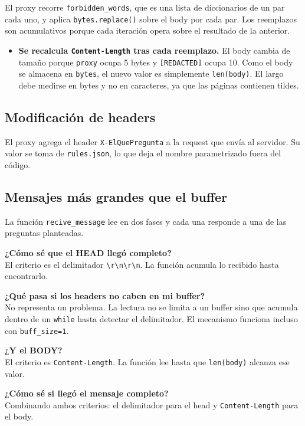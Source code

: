 \documentclass[11pt,a4paper]{article}
\newcommand{\crlf}{\texttt{\textbackslash r\textbackslash n}}
\begin{document}
El proxy recorre \texttt{forbidden\_words}, que es una lista de diccionarios de un par cada uno, y
aplica \texttt{bytes.replace()} sobre el body por cada par. Los reemplazos son acumulativos porque
cada iteración opera sobre el resultado de la anterior.

\begin{itemize}
  \item \textbf{Se recalcula \texttt{Content-Length} tras cada reemplazo.} El body cambia de tamaño
        porque \texttt{proxy} ocupa 5 bytes y \texttt{[REDACTED]} ocupa 10. Como el body se
        almacena en \texttt{bytes}, el nuevo valor es simplemente \texttt{len(body)}. El largo debe
        medirse en bytes y no en caracteres, ya que las páginas contienen tildes.
\end{itemize}

\subsection{Modificación de headers}

El proxy agrega el header \texttt{X-ElQuePregunta} a la request que envía al servidor. Su valor se
toma de \texttt{rules.json}, lo que deja el nombre parametrizado fuera del código.

\subsection{Mensajes más grandes que el buffer}

La función \texttt{recive\_message} lee en dos fases y cada una responde a una de las preguntas
planteadas.

\medskip
\noindent\textbf{¿Cómo sé que el HEAD llegó completo?} \\
El criterio es el delimitador \crlf\crlf. La función acumula lo recibido hasta encontrarlo.

\medskip
\noindent\textbf{¿Qué pasa si los headers no caben en mi buffer?} \\
No representa un problema. La lectura no se limita a un buffer sino que acumula dentro de un
\texttt{while} hasta detectar el delimitador. El mecanismo funciona incluso con
\texttt{buff\_size=1}.

\medskip
\noindent\textbf{¿Y el BODY?} \\
El criterio es \texttt{Content-Length}. La función lee hasta que \texttt{len(body)} alcanza ese
valor.

\medskip
\noindent\textbf{¿Cómo sé si llegó el mensaje completo?} \\
Combinando ambos criterios: el delimitador para el head y \texttt{Content-Length} para el body.
\end{document}

